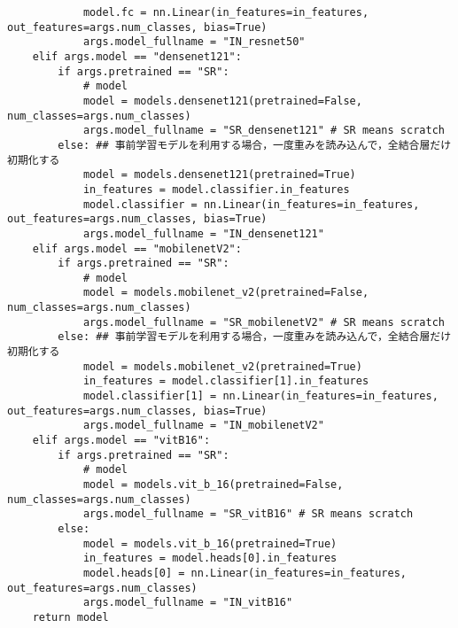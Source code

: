 {\begin{verbatim}
            model.fc = nn.Linear(in_features=in_features, out_features=args.num_classes, bias=True)
            args.model_fullname = "IN_resnet50"
    elif args.model == "densenet121":
        if args.pretrained == "SR":
            # model
            model = models.densenet121(pretrained=False, num_classes=args.num_classes)
            args.model_fullname = "SR_densenet121" # SR means scratch
        else: ## 事前学習モデルを利用する場合，一度重みを読み込んで，全結合層だけ初期化する
            model = models.densenet121(pretrained=True)
            in_features = model.classifier.in_features
            model.classifier = nn.Linear(in_features=in_features, out_features=args.num_classes, bias=True)
            args.model_fullname = "IN_densenet121"
    elif args.model == "mobilenetV2":
        if args.pretrained == "SR":
            # model
            model = models.mobilenet_v2(pretrained=False, num_classes=args.num_classes)
            args.model_fullname = "SR_mobilenetV2" # SR means scratch
        else: ## 事前学習モデルを利用する場合，一度重みを読み込んで，全結合層だけ初期化する
            model = models.mobilenet_v2(pretrained=True)
            in_features = model.classifier[1].in_features
            model.classifier[1] = nn.Linear(in_features=in_features, out_features=args.num_classes, bias=True)
            args.model_fullname = "IN_mobilenetV2"
    elif args.model == "vitB16":
        if args.pretrained == "SR":
            # model
            model = models.vit_b_16(pretrained=False, num_classes=args.num_classes)
            args.model_fullname = "SR_vitB16" # SR means scratch
        else: 
            model = models.vit_b_16(pretrained=True)
            in_features = model.heads[0].in_features
            model.heads[0] = nn.Linear(in_features=in_features, out_features=args.num_classes)
            args.model_fullname = "IN_vitB16"
    return model


\end{verbatim}}
